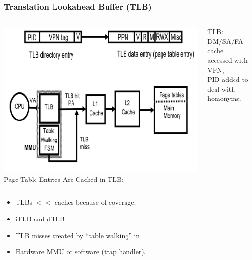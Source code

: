 \documentclass{beamer}
\begin{document}
\begin{frame}[fragile,t]
\frametitle{Translation Lookahead Buffer (TLB)}

\begin{columns}
\includegraphics[width=40ex]{FigsMemH/TLB}
Page Table Entries Are Cached in TLB:\\\smallskip
\begin{scriptsize}
TLB: DM/SA/FA cache accessed with VPN,\\
PID added to deal with homonyms.
\end{scriptsize}
\end{columns}

\begin{itemize}
\item TLBs $<<$ caches because of coverage.
\item iTLB and dTLB
\item TLB misses treated by ``table walking'' in 
\item Hardware MMU or software (trap handler).
\end{itemize}\bigskip

\end{frame}
\end{document}
